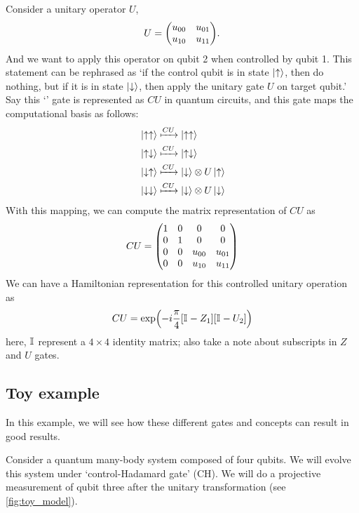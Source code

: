\documentclass[11pt, oneside, listof=totoc]{scrbook}
\renewcommand{\u}{\uparrow}
\renewcommand{\d}{\downarrow}
\newcommand{\ku}{\ket{\uparrow}}
\newcommand{\kd}{\ket{\downarrow}}
\begin{document}
\noindent Consider a unitary operator \(U\),
\[
    U = \mqty(u_{00} & u_{01} \\ u_{10} & u_{11}).
\]
And we want to apply this operator on qubit 2 when controlled by qubit 1. This statement can be rephrased as `if the control qubit is in state \(\ku\), then do nothing, but if it is in state \(\kd\), then apply the unitary gate \(U\) on target qubit.' Say this `' gate is represented as \(CU\) in quantum circuits, and this gate maps the computational basis as follows:
\begin{align*}
     & \ket{\u \u} \xmapsto{CU} \ket{\u \u}      \\
     & \ket{\u \d} \xmapsto{CU} \ket{\u \d}      \\
     & \ket{\d \u} \xmapsto{CU} \kd \otimes U\ku \\
     & \ket{\d \d} \xmapsto{CU} \kd \otimes U\kd \\
\end{align*}
With this mapping, we can compute the matrix representation of \(CU\) as
\begin{equation}
    CU = \mqty(
    1 & 0 & 0 & 0 \\
    0 & 1 & 0 & 0 \\
    0 & 0 & u_{00} & u_{01} \\
    0 & 0 & u_{10} & u_{11}
    )
\end{equation}
We can have a Hamiltonian representation for this controlled unitary operation as
\begin{equation}\label{eq:CU-exp}
    CU = \exp(- i \frac{\pi}{4} [\mathbb{I}_{} - Z_1][\mathbb{I}_{} - U_2])
\end{equation}
here, \(\mathbb{I}_{}\) represent a \(4 \times 4\) identity matrix; also take a note about subscripts in \(Z\) and \(U\) gates.

\subsection{Toy example}

In this example, we will see how these different gates and concepts can result in good results.

\noindent Consider a quantum many-body system composed of four qubits. We will evolve this system under `control-Hadamard gate' (CH). We will do a projective measurement of qubit three after the unitary transformation (see \cref{fig:toy_model}).
\end{document}
